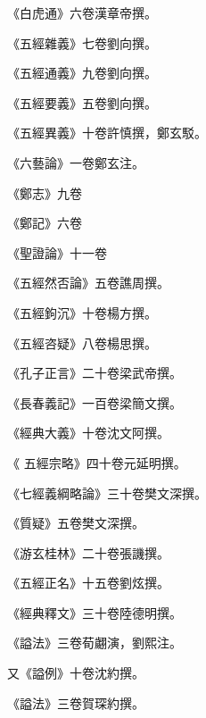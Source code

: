 \begin{pinyinscope}
 《白虎通》六卷漢章帝撰。



 《五經雜義》七卷劉向撰。



 《五經通義》九卷劉向撰。



 《五經要義》五卷劉向撰。



 《五經異義》十卷許慎撰，鄭玄駁。



 《六藝論》一卷鄭玄注。



 《鄭志》九卷



 《鄭記》六卷



 《聖證論》十一卷



 《五經然否論》五卷譙周撰。



 《五經鉤沉》十卷楊方撰。



 《五經咨疑》八卷楊思撰。



 《孔子正言》二十卷梁武帝撰。



 《長春義記》一百卷梁簡文撰。



 《經典大義》十卷沈文阿撰。



 《
 五經宗略》四十卷元延明撰。



 《七經義綱略論》三十卷樊文深撰。



 《質疑》五卷樊文深撰。



 《游玄桂林》二十卷張譏撰。



 《五經正名》十五卷劉炫撰。



 《經典釋文》三十卷陸德明撰。



 《謚法》三卷荀翽演，劉熙注。



 又《謚例》十卷沈約撰。



 《謚法》三卷賀琛約撰。




\end{pinyinscope}
